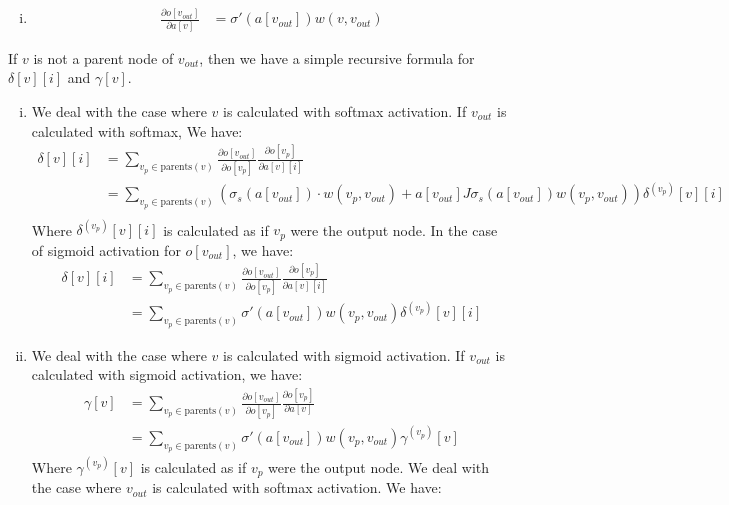 \documentclass{amsart}
\theoremstyle{definition}
\begin{document}
\begin{enumerate}[(a)]
\begin{enumerate}[i.]
      \item
        \begin{align*}
          \frac{\partial o[v_{out}]}{\partial a[v]} &= \sigma'(a[v_{out}]) w(v, v_{out})
        \end{align*}
    \end{enumerate}
    If $v$ is not a parent node of $v_{out}$, then we have a simple recursive formula for $\delta[v][i]$ and $\gamma[v]$. 
    \begin{enumerate}[i.]
      \item 
        We deal with the case where $v$ is calculated with softmax activation. If $v_{out}$ is calculated with softmax, We have:
        \begin{align*}
          \delta[v][i] &= \sum_{v_p \in \text{parents}(v)} \frac{\partial o[v_{out}]}{\partial o[v_p]} \frac{\partial o[v_p]}{\partial a[v][i]} \\
          &= \sum_{v_p \in \text{parents}(v)} \left(\sigma_s(a[v_{out}]) \cdot w(v_p, v_{out}) + a[v_{out}] J \sigma_s(a[v_{out}]) w(v_p, v_{out})\right) \delta^{(v_p)}[v][i] \\
        \end{align*}
        Where $\delta^{(v_p)}[v][i]$ is calculated as if $v_p$ were the output node. 
        In the case of sigmoid activation for $o[v_{out}]$, we have:
        \begin{align*}
          \delta[v][i] &= \sum_{v_p \in \text{parents}(v)} \frac{\partial o[v_{out}]}{\partial o[v_p]} \frac{\partial o[v_p]}{\partial a[v][i]} \\
          &= \sum_{v_p \in \text{parents}(v)} \sigma'(a[v_{out}]) w(v_p, v_{out}) \delta^{(v_p)}[v][i]
        \end{align*}
      \item
        We deal with the case where $v$ is calculated with sigmoid activation. If $v_{out}$ is calculated with sigmoid activation, we have:
        \begin{align*}
          \gamma[v] &= \sum_{v_p \in \text{parents}(v)} \frac{\partial o[v_{out}]}{\partial o[v_p]} \frac{\partial o[v_p]}{\partial a[v]} \\
          &= \sum_{v_p \in \text{parents}(v)} \sigma'(a[v_{out}]) w(v_p, v_{out}) \gamma^{(v_p)}[v]
        \end{align*}
        Where $\gamma^{(v_p)}[v]$ is calculated as if $v_p$ were the output node.
        We deal with the case where $v_{out}$ is calculated with softmax activation. We have:
        \begin{align*}

\end{align*}
\end{enumerate}
\end{enumerate}
\end{document}
